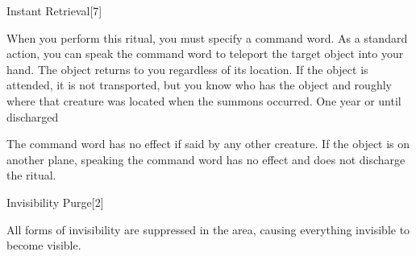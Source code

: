 \begin{spellsection}{Instant Retrieval}[7]
    \begin{spellheader}
    \end{spellheader}
    \begin{spellcontent}
        \begin{spelltargetinginfo}
        \end{spelltargetinginfo}
        \begin{spelleffects}

            \spellspecial When you perform this ritual, you must specify a command word.
            \spelleffect As a standard action, you can speak the command word to teleport the target object into your hand. The object returns to you regardless of its location. If the object is attended, it is not transported, but you know who has the object and roughly where that creature was located when the summons occurred.
            \spelldur One year or until discharged
        \end{spelleffects}
    \end{spellcontent}
    \begin{spellfooter}
        \spellnotes The command word has no effect if said by any other creature. If the object is on another plane, speaking the command word has no effect and does not discharge the ritual.
    \end{spellfooter}
\end{spellsection}

\begin{spellsection}{Invisibility Purge}[2]
    \begin{spellheader}
    \end{spellheader}
    \begin{spellcontent}
        \begin{spelltargetinginfo}
        \end{spelltargetinginfo}
        \begin{spelleffects}

            \spellline
            \spelleffect All forms of invisibility are suppressed in the area, causing everything invisible to become visible.
            \spelldur \durlong \dismissable
        \end{spelleffects}
    \end{spellcontent}
    \begin{spellfooter}
    \end{spellfooter}
\end{spellsection}

